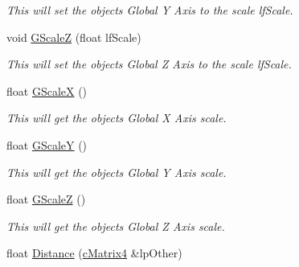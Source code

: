 \begin{DoxyCompactItemize}
\begin{DoxyCompactList}\small\item\em This will set the objects Global Y Axis to the scale lfScale. \end{DoxyCompactList}\item 
\hypertarget{classc_matrix4_aa8cf98447437599b613eb491f510ee7d}{
void \hyperlink{classc_matrix4_aa8cf98447437599b613eb491f510ee7d}{GScaleZ} (float lfScale)}
\label{classc_matrix4_aa8cf98447437599b613eb491f510ee7d}

\begin{DoxyCompactList}\small\item\em This will set the objects Global Z Axis to the scale lfScale. \end{DoxyCompactList}\item 
\hypertarget{classc_matrix4_a74c4a8cd7539f99ba2d5c8c98f757748}{
float \hyperlink{classc_matrix4_a74c4a8cd7539f99ba2d5c8c98f757748}{GScaleX} ()}
\label{classc_matrix4_a74c4a8cd7539f99ba2d5c8c98f757748}

\begin{DoxyCompactList}\small\item\em This will get the objects Global X Axis scale. \end{DoxyCompactList}\item 
\hypertarget{classc_matrix4_aa9493e86b746ba33d0135d4adcf74b3e}{
float \hyperlink{classc_matrix4_aa9493e86b746ba33d0135d4adcf74b3e}{GScaleY} ()}
\label{classc_matrix4_aa9493e86b746ba33d0135d4adcf74b3e}

\begin{DoxyCompactList}\small\item\em This will get the objects Global Y Axis scale. \end{DoxyCompactList}\item 
\hypertarget{classc_matrix4_af5ad4a4ea96eb13c9c12b6edfa1f96c2}{
float \hyperlink{classc_matrix4_af5ad4a4ea96eb13c9c12b6edfa1f96c2}{GScaleZ} ()}
\label{classc_matrix4_af5ad4a4ea96eb13c9c12b6edfa1f96c2}

\begin{DoxyCompactList}\small\item\em This will get the objects Global Z Axis scale. \end{DoxyCompactList}\item 
\hypertarget{classc_matrix4_ae9eae21b1f949a96b77968b7d4d68306}{
float \hyperlink{classc_matrix4_ae9eae21b1f949a96b77968b7d4d68306}{Distance} (\hyperlink{classc_matrix4}{cMatrix4} \&lpOther)}
\label{classc_matrix4_ae9eae21b1f949a96b77968b7d4d68306}


\end{DoxyCompactItemize}

